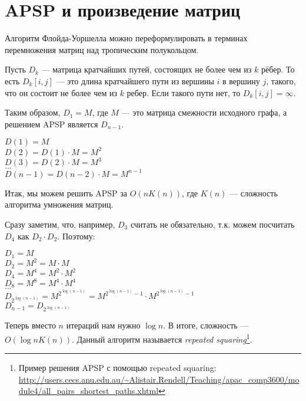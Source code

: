 \section{APSP и произведение матриц}

Алгоритм Флойда-Уоршелла можно переформулировать в терминах перемножения матриц над тропическим полукольцом.

Пусть $D_k$ --- матрица кратчайших путей, состоящих не более чем из $k$ рёбер. То есть $D_k[i,j]$ --- это длина кратчайшего пути из вершины $i$ в вершину $j$, такого, что он состоит не более чем из $k$ ребер. Если такого пути нет, то $D_k[i,j] = \infty$.

Таким образом, $D_1 = M$, где $M$ --- это матрица смежности исходного графа, а решением APSP является $D_{n-1}$.

\begin{center}
    $D(1) = M$ \\
    $D(2) = D(1) \cdot M = M^2$ \\
    $D(3) = D(2) \cdot M = M^3$ \\
    $\dots$ \\
    $D(n-1) = D(n-2) \cdot M = M^{n-1}$ \\
\end{center}

Итак, мы можем решить APSP за $O(n K(n))$, где $K(n)$ --- сложность алгоритма умножения матриц.

Сразу заметим, что, например, $D_3$ считать не обязательно, т.к. можем посчитать $D_4$ как $D_2 \cdot D_2$.
Поэтому:

\begin{center}
    $D_1 = M$ \\
    $D_2 = M^2 = M \cdot M$ \\
    $D_4 = M^4 = M^2 \cdot M^2$ \\
    $D_8 = M^8 = M^4 \cdot M^4$ \\
    $\dots$ \\
    $D_{2^{\log(n-1)}} = M^{2^{\log(n-1)}} = M^{2^{\log(n-1)} - 1} \cdot M^{2^{\log(n-1)} - 1}$ \\
    $D_{n-1} = D_{2^{\log(n-1)}}$ \\
\end{center}

Теперь вместо $n$ итераций нам нужно $\log{n}$. В итоге, сложность --- $O(\log{n} K(n))$.
Данный алгоритм называется \textit{repeated squaring}\footnote{Пример решения APSP с помощью repeated squaring: \url{http://users.cecs.anu.edu.au/~Alistair.Rendell/Teaching/apac_comp3600/module4/all_pairs_shortest_paths.xhtml}}.


